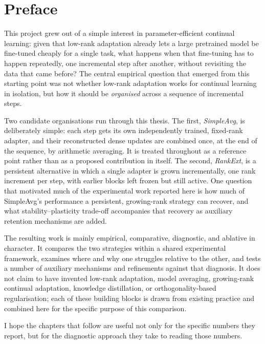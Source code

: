 \chapter*{Preface}

This project grew out of a simple interest in parameter-efficient continual
learning: given that low-rank adaptation already lets a large pretrained
model be fine-tuned cheaply for a single task, what happens when that
fine-tuning has to happen repeatedly, one incremental step after another,
without revisiting the data that came before? The central empirical
question that emerged from this starting point was not whether low-rank
adaptation works for continual learning in isolation, but how it should be
\emph{organised} across a sequence of incremental steps.

Two candidate organisations run through this thesis. The first,
\emph{SimpleAvg}, is deliberately simple: each step gets its own
independently trained, fixed-rank adapter, and their reconstructed dense
updates are combined once, at the end of the sequence, by arithmetic
averaging. It is treated throughout as a
reference point rather than as a proposed contribution in itself. The
second, \emph{RankExt}, is a persistent alternative in which a single
adapter is grown incrementally, one rank increment per step, with earlier
blocks left frozen but still active. One question that motivated much of
the experimental work reported here is how much of SimpleAvg's performance
a persistent, growing-rank strategy can recover, and what
stability--plasticity trade-off accompanies that recovery as auxiliary retention
mechanisms are added.

The resulting work is mainly empirical, comparative, diagnostic, and
ablative in character. It compares the two strategies within a shared
experimental framework, examines where and why one struggles relative to the other, and
tests a number of auxiliary mechanisms and refinements against that
diagnosis. It does not claim to have invented low-rank adaptation, model
averaging, growing-rank continual adaptation, knowledge distillation, or
orthogonality-based regularisation; each of these building blocks is drawn
from existing practice and combined here for the specific purpose of this
comparison.

I hope the chapters that follow are useful not only for the specific
numbers they report, but for the diagnostic approach they take to reading
those numbers.

